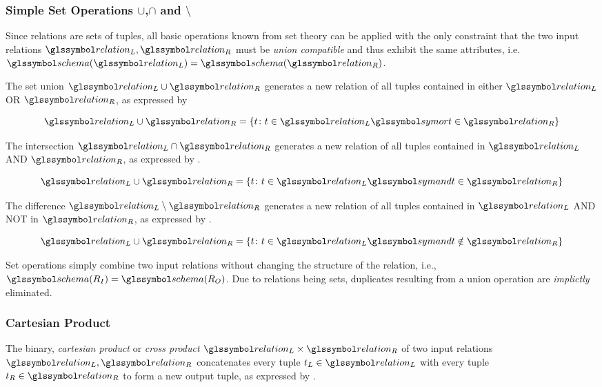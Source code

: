 \subsubsection{Simple Set Operations $\cup$,$\cap$ and $\setminus$}

Since relations are sets of tuples, all basic operations known from set theory can be applied with the only constraint that the two input relations $\relation_L,\relation_R$ must be \emph{union compatible} and thus exhibit the same attributes, i.e. $\schema(\relation_L) = \schema(\relation_R)$.

The set union $\relation_L \cup \relation_R$ generates a new relation of all tuples contained in either $\relation_L$ OR $\relation_R$, as expressed by 

\begin{equation}
    \label{equation:rel_op_union}
    \relation_L \cup \relation_R = \{ t \colon t \in \relation_L \symor t \in \relation_R \}
\end{equation}

The intersection $\relation_L \cap \relation_R$ generates a new relation of all tuples contained in $\relation_L$ AND $\relation_R$, as expressed by .

\begin{equation}
    \label{equation:rel_op_intersection}
    \relation_L \cup \relation_R = \{ t \colon t \in \relation_L \symand t \in \relation_R \}
\end{equation}

The difference $\relation_L \setminus \relation_R$ generates a new relation of all tuples contained in $\relation_L$ AND NOT in $\relation_R$, as expressed by .

\begin{equation}
    \label{equation:rel_op_difference}
    \relation_L \cup \relation_R = \{ t \colon t \in \relation_L \symand t \notin \relation_R \}
\end{equation}

Set operations simply combine two input relations without changing the structure of the relation, i.e., $\schema(R_{I}) = \schema(R_{O})$. Due to relations being sets, duplicates resulting from a union operation are \emph{implictly} eliminated.

\subsubsection{Cartesian Product}
The binary, \emph{cartesian product} or \emph{cross product} $\relation_L \times \relation_R$ of two input relations $\relation_L,\relation_R$ concatenates every tuple $t_{L} \in \relation_L$ with every tuple $t_{R} \in \relation_R$ to form a new output tuple, as expressed by .

